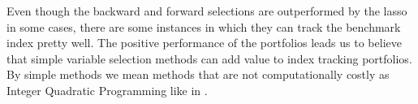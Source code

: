 \documentclass[12pt,oneside,a4paper]{memoir}
\begin{document}
Even though the backward and forward selections are outperformed by the lasso in some cases, there are some instances in which they can track the benchmark index pretty well.
The positive performance of the portfolios leads us to believe that simple variable selection methods can add value to index tracking portfolios.
By simple methods we mean methods that are not computationally costly as Integer Quadratic Programming like in .



\clearpage 


% 



\begin{landscape}

\end{landscape}

\begin{landscape}

\end{landscape}
\end{document}
